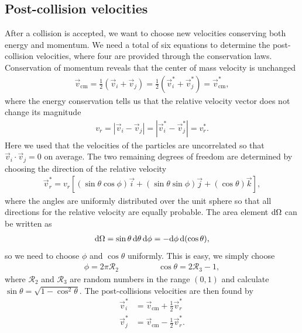 \subsection{Post-collision velocities}
After a collision is accepted, we want to choose new velocities conserving both energy and momentum. We need a total of six equations to determine the post-collision velocities, where four are provided through the conservation laws. Conservation of momentum reveals that the center of mass velocity is unchanged
\begin{align}
	\vec v_\text{cm} = \frac{1}{2}(\vec v_i + \vec v_j) = \frac{1}{2}(\vec v_i^* + \vec v_j^*) = \vec v_\text{cm}^*,
\end{align}
where the energy conservation tells us that the relative velocity vector does not change its magnitude
\begin{align}
	v_r = |\vec v_i - \vec v_j| = |\vec v_i^* - \vec v_j^*| = v_r^*.
\end{align}
Here we used that the velocities of the particles are uncorrelated so that $\vec v_i\cdot\vec v_j = 0$ on average. The two remaining degrees of freedom are determined by choosing the direction of the relative velocity
\begin{align}
	\vec v_r^* = v_r\left[(\sin\theta\cos\phi)\vec i + (\sin\theta\sin\phi) \vec j + (\cos\theta)\vec k\right],
\end{align}
where the angles are uniformly distributed over the unit sphere so that all directions for the relative velocity are equally probable. The area element $\mathrm{d}\Omega$ can be written as
\begin{align}
	\mathrm{d}\Omega = \sin\theta\,\mathrm{d}\theta\,\mathrm{d}\phi = -\mathrm{d}\phi\,\mathrm{d}(\cos\theta),
\end{align}
so we need to choose $\phi$ and $\cos\theta$ uniformly. This is easy, we simply choose 
\begin{align*}
	\phi = 2\pi\mathcal{R}_2 & \qquad \qquad \cos\theta = 2\mathcal{R}_3 - 1,
\end{align*}
where $\mathcal{R}_2$ and $\mathcal{R}_3$ are random numbers in the range $(0,1)$ and calculate $\sin\theta = \sqrt{1 - \cos^2\theta}$. The post-collisions velocities are then found by
\begin{align}
	\vec v_i^* &= \vec v_\text{cm} + \frac{1}{2}\vec v_r^*\\
	\vec v_j^* &= \vec v_\text{cm} - \frac{1}{2}\vec v_r^*.
\end{align}